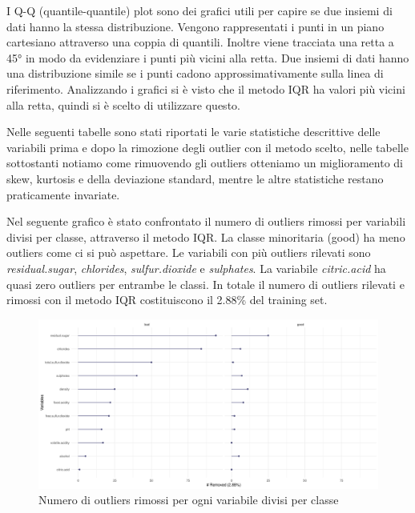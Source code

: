 \vspace{4mm}
\noindent
I Q-Q (quantile-quantile) plot sono dei grafici utili per capire se due insiemi di dati hanno la stessa distribuzione. Vengono rappresentati i punti in un piano cartesiano attraverso una coppia di quantili. Inoltre viene tracciata una retta a 45° in modo da evidenziare i punti più vicini alla retta. Due insiemi di dati hanno una distribuzione simile se i punti cadono approssimativamente sulla linea di riferimento.
Analizzando i grafici si è visto che il metodo IQR ha valori più vicini alla retta, quindi si è scelto di utilizzare questo.

\newpage
\noindent
Nelle seguenti tabelle sono stati riportati le varie statistiche descrittive delle variabili prima e dopo la rimozione degli outlier con il metodo scelto, nelle tabelle sottostanti notiamo come rimuovendo gli outliers otteniamo un miglioramento di skew, kurtosis e della deviazione standard, mentre le altre statistiche restano praticamente invariate.





\newpage
\noindent
Nel seguente grafico è stato confrontato il numero di outliers rimossi per variabili divisi per classe, attraverso il metodo IQR. La classe minoritaria (good) ha meno outliers come ci si può aspettare. Le variabili con più outliers rilevati sono \textit{residual.sugar}, \textit{chlorides}, \textit{sulfur.dioxide} e \textit{sulphates}. La variabile \textit{citric.acid} ha quasi zero outliers per entrambe le classi. In totale il numero di outliers rilevati e rimossi con il metodo IQR costituiscono il 2.88\% del training set.

\begin{figure}
    \centering
    \includegraphics[width=\textwidth]{images/outliers/iqr-outliers.png}
    \caption{Numero di outliers rimossi per ogni variabile divisi per classe}
    \label{fig:iqr-removed-outliers}
\end{figure}

